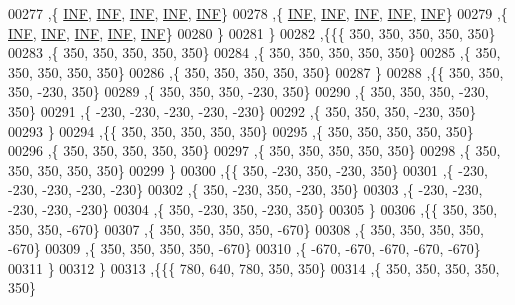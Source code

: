 \begin{DoxyCode}
00277    ,\{   \mbox{\hyperlink{energy__const_8h_a12c2040f25d8e3a7b9e1c2024c618cb6}{INF}},   \mbox{\hyperlink{energy__const_8h_a12c2040f25d8e3a7b9e1c2024c618cb6}{INF}},   \mbox{\hyperlink{energy__const_8h_a12c2040f25d8e3a7b9e1c2024c618cb6}{INF}},   \mbox{\hyperlink{energy__const_8h_a12c2040f25d8e3a7b9e1c2024c618cb6}{INF}},   \mbox{\hyperlink{energy__const_8h_a12c2040f25d8e3a7b9e1c2024c618cb6}{INF}}\}
00278    ,\{   \mbox{\hyperlink{energy__const_8h_a12c2040f25d8e3a7b9e1c2024c618cb6}{INF}},   \mbox{\hyperlink{energy__const_8h_a12c2040f25d8e3a7b9e1c2024c618cb6}{INF}},   \mbox{\hyperlink{energy__const_8h_a12c2040f25d8e3a7b9e1c2024c618cb6}{INF}},   \mbox{\hyperlink{energy__const_8h_a12c2040f25d8e3a7b9e1c2024c618cb6}{INF}},   \mbox{\hyperlink{energy__const_8h_a12c2040f25d8e3a7b9e1c2024c618cb6}{INF}}\}
00279    ,\{   \mbox{\hyperlink{energy__const_8h_a12c2040f25d8e3a7b9e1c2024c618cb6}{INF}},   \mbox{\hyperlink{energy__const_8h_a12c2040f25d8e3a7b9e1c2024c618cb6}{INF}},   \mbox{\hyperlink{energy__const_8h_a12c2040f25d8e3a7b9e1c2024c618cb6}{INF}},   \mbox{\hyperlink{energy__const_8h_a12c2040f25d8e3a7b9e1c2024c618cb6}{INF}},   \mbox{\hyperlink{energy__const_8h_a12c2040f25d8e3a7b9e1c2024c618cb6}{INF}}\}
00280    \}
00281   \}
00282  ,\{\{\{   350,   350,   350,   350,   350\}
00283    ,\{   350,   350,   350,   350,   350\}
00284    ,\{   350,   350,   350,   350,   350\}
00285    ,\{   350,   350,   350,   350,   350\}
00286    ,\{   350,   350,   350,   350,   350\}
00287    \}
00288   ,\{\{   350,   350,   350,  -230,   350\}
00289    ,\{   350,   350,   350,  -230,   350\}
00290    ,\{   350,   350,   350,  -230,   350\}
00291    ,\{  -230,  -230,  -230,  -230,  -230\}
00292    ,\{   350,   350,   350,  -230,   350\}
00293    \}
00294   ,\{\{   350,   350,   350,   350,   350\}
00295    ,\{   350,   350,   350,   350,   350\}
00296    ,\{   350,   350,   350,   350,   350\}
00297    ,\{   350,   350,   350,   350,   350\}
00298    ,\{   350,   350,   350,   350,   350\}
00299    \}
00300   ,\{\{   350,  -230,   350,  -230,   350\}
00301    ,\{  -230,  -230,  -230,  -230,  -230\}
00302    ,\{   350,  -230,   350,  -230,   350\}
00303    ,\{  -230,  -230,  -230,  -230,  -230\}
00304    ,\{   350,  -230,   350,  -230,   350\}
00305    \}
00306   ,\{\{   350,   350,   350,   350,  -670\}
00307    ,\{   350,   350,   350,   350,  -670\}
00308    ,\{   350,   350,   350,   350,  -670\}
00309    ,\{   350,   350,   350,   350,  -670\}
00310    ,\{  -670,  -670,  -670,  -670,  -670\}
00311    \}
00312   \}
00313  ,\{\{\{   780,   640,   780,   350,   350\}
00314    ,\{   350,   350,   350,   350,   350\}

\end{DoxyCode}
